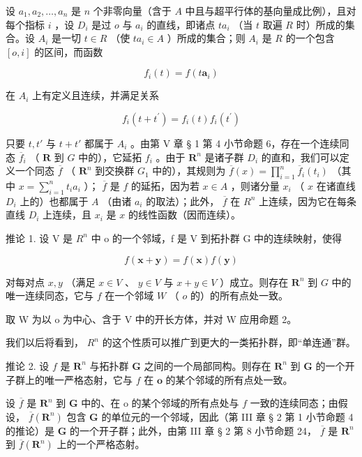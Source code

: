 设 \(a_1, a_2, \ldots, a_n\) 是 \(n\) 个非零向量（含于 \(A\) 中且与超平行体的基向量成比例），且对每个指标 \(i\) ，设 \(D_i\) 是过 \(o\) 与 \(a_i\) 的直线，即诸点 \(ta_i\) （当 \(t\) 取遍 \(R\) 时）所成的集合。设 \(A_i\) 是一切 \(t \in R\) （使 \(ta_i \in A\) ）所成的集合；则 \(A_i\) 是 \(R\) 的一个包含 \([o, i]\) 的区间，而函数

\[
f _ {i} (t) = f \left(t \boldsymbol {a} _ {i}\right)
\]

在 \(A_{i}\) 上有定义且连续，并满足关系

\[
f _ {i} (t + t ^ {\prime}) = f _ {i} (t) f _ {i} (t ^ {\prime})
\]

只要 \(t, t'\) 与 \(t + t'\) 都属于 \(A_i\) 。由第 V 章 § 1 第 4 小节命题 6，存在一个连续同态 \(\overline{f}_i\) （ \(\mathbf{R}\) 到 \(G\) 中的），它延拓 \(f_i\) 。由于 \(\mathbf{R}^n\) 是诸子群 \(D_i\) 的直和，我们可以定义一个同态 \(\overline{f}\) （ \(\mathbf{R}^n\) 到交换群 \(G_1\) 中的），其规则为 \(\overline{f}(x) = \prod_{i=1}^{n} \overline{f}_i(t_i)\) （其中 \(x = \sum_{i=1}^{n} t_i a_i\) ）； \(\overline{f}\) 是 \(f\) 的延拓，因为若 \(x \in A\) ，则诸分量 \(x_i\) （ \(x\) 在诸直线 \(D_i\) 上的）也都属于 \(A\) （由诸 \(a_i\) 的取法）；此外， \(\overline{f}\) 在 \(R^n\) 上连续，因为它在每条直线 \(D_i\) 上连续，且 \(x_i\) 是 \(x\) 的线性函数（因而连续）。

推论 1. 设 V 是 \(R^{n}\) 中 o 的一个邻域，f 是 V 到拓扑群 G 中的连续映射，使得

\[
f (\boldsymbol {x} + \boldsymbol {y}) = f (\boldsymbol {x}) f (\boldsymbol {y})
\]

对每对点 \(x, y\) （满足 \(x \in V\) 、 \(y \in V\) 与 \(x + y \in V\) ）成立。则存在 \(\mathbf{R}^n\) 到 \(G\) 中的唯一连续同态，它与 \(f\) 在一个邻域 \(W\) （ \(o\) 的）的所有点处一致。

取 W 为以 o 为中心、含于 V 中的开长方体，并对 W 应用命题 2。

我们以后将看到， \(R^{n}\) 的这个性质可以推广到更大的一类拓扑群，即“单连通”群。

推论 2. 设 \(f\) 是 \(\mathbf{R}^n\) 与拓扑群 \(\mathbf{G}\) 之间的一个局部同构。则存在 \(\mathbf{R}^n\) 到 \(\mathbf{G}\) 的一个开子群上的唯一严格态射，它与 \(f\) 在 \(\mathbf{o}\) 的某个邻域的所有点处一致。

设 \(\overline{f}\) 是 \(\mathbf{R}^n\) 到 \(\mathbf{G}\) 中的、在 o 的某个邻域的所有点处与 \(f\) 一致的连续同态；由假设， \(\overline{f}(\mathbf{R}^n)\) 包含 \(\mathbf{G}\) 的单位元的一个邻域，因此（第 III 章 § 2 第 1 小节命题 4 的推论）是 \(\mathbf{G}\) 的一个开子群；此外，由第 III 章 § 2 第 8 小节命题 24， \(\overline{f}\) 是 \(\mathbf{R}^n\) 到 \(\overline{f}(\mathbf{R}^n)\) 上的一个严格态射。

